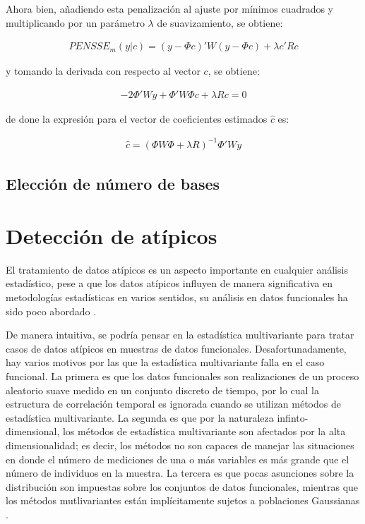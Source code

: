 \documentclass[
]{book}
\begin{document}
Ahora bien, añadiendo esta penalización al ajuste por mínimos cuadrados y multiplicando por un parámetro \(\lambda\) de suavizamiento, se obtiene:

\begin{align}
    PENSSE_m(y|c)=(y-\Phi c)'W(y-\Phi c)+\lambda c'Rc
\end{align}

y tomando la derivada con respecto al vector \(c\), se obtiene:

\begin{align}
    -2\Phi'Wy + \Phi' W \Phi c + \lambda R c=0
\end{align}

de done la expresión para el vector de coeficientes estimados \({\hat{c}}\) es:

\begin{align}
    {\hat{c}}=(\Phi W \Phi + \lambda R)^{-1} \Phi' Wy
\end{align}

\hypertarget{elecciuxf3n-de-nuxfamero-de-bases}{%
\subsection{Elección de número de bases}\label{elecciuxf3n-de-nuxfamero-de-bases}}

\hypertarget{detecciuxf3n-de-atuxedpicos}{%
\section{Detección de atípicos}\label{detecciuxf3n-de-atuxedpicos}}

El tratamiento de datos atípicos es un aspecto importante en cualquier análisis estadístico, pese a que los datos atípicos influyen de manera significativa en metodologías estadísticas en varios sentidos, su análisis en datos funcionales ha sido poco abordado \citep{oviedo}.

De manera intuitiva, se podría pensar en la estadística multivariante para tratar casos de datos atípicos en muestras de datos funcionales. Desafortunadamente, hay varios motivos por las que la estadística multivariante falla en el caso funcional. La primera es que los datos funcionales son realizaciones de un proceso aleatorio suave medido en un conjunto discreto de tiempo, por lo cual la estructura de correlación temporal es ignorada cuando se utilizan métodos de estadística multivariante. La segunda es que por la naturaleza infinto-dimensional, los métodos de estadística multivariante son afectados por la alta dimensionalidad; es decir, los métodos no son capaces de manejar las situaciones en donde el número de mediciones de una o más variables es más grande que el número de individuos en la muestra. La tercera es que pocas asunciones sobre la distribución son impuestas sobre los conjuntos de datos funcionales, mientras que los métodos mutlivariantes están implícitamente sujetos a poblaciones Gaussianas \citep{oviedo}.
\end{document}

